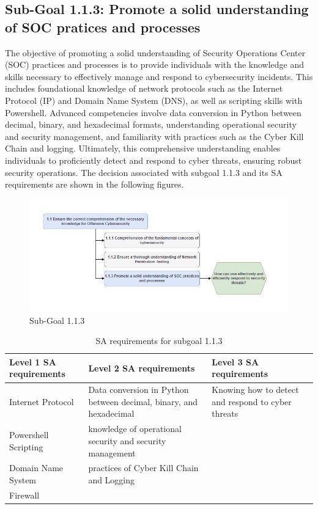 \newpage
\subsection{Sub-Goal 1.1.3: Promote a solid understanding of SOC pratices and processes}
The objective of promoting a solid understanding of Security Operations Center (SOC) practices and processes is to provide individuals with the knowledge and skills necessary to effectively manage and respond to cybersecurity incidents. This includes foundational knowledge of network protocols such as the Internet Protocol (IP) and Domain Name System (DNS), as well as scripting skills with Powershell. Advanced competencies involve data conversion in Python between decimal, binary, and hexadecimal formats, understanding operational security and security management, and familiarity with practices such as the Cyber Kill Chain and logging. Ultimately, this comprehensive understanding enables individuals to proficiently detect and respond to cyber threats, ensuring robust security operations.
The decision associated with subgoal 1.1.3 and its SA requirements are shown in the following figures.

\begin{figure}[H]
    \centering
    \includegraphics[width=\textwidth]{./assets/subgoal_1.1.3.png}
    \caption{Sub-Goal 1.1.3}
    \label{fig:subgoal1.1.3}
\end{figure}

\begin{table}[H]
\begin{center}
\begin{tabular}{ | m{5cm} | m{5cm}| m{5cm} | } 
  \hline
  \textbf{Level 1 SA requirements} & \textbf{Level 2 SA requirements}  & \textbf{Level 3 SA requirements}  \\ 
  \hline
  Internet Protocol & Data conversion in Python between decimal, binary, and hexadecimal & Knowing how to detect and respond to cyber threats\\ 
  \hline
  Powershell Scripting & knowledge of operational security and security management & \\ 
  \hline
  Domain Name System & practices of Cyber Kill Chain and Logging & \\ 
  \hline
  Firewall &  & \\ 
  \hline
\end{tabular}
\end{center}
\caption{SA requirements for subgoal 1.1.3}
\end{table}

